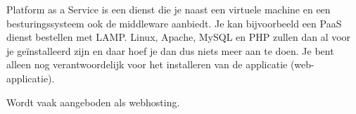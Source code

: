 Platform as a Service is een dienst die je naast een virtuele machine en een besturingssysteem ook de middleware aanbiedt. Je kan bijvoorbeeld een PaaS dienst bestellen met LAMP. Linux, Apache, MySQL en PHP zullen dan al voor je ge\"installeerd zijn en daar hoef je dan dus niets meer aan te doen. Je bent alleen nog verantwoordelijk voor het installeren van de applicatie (web-applicatie).

Wordt vaak aangeboden als webhosting.
